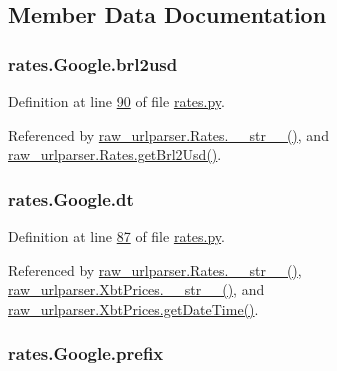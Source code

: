 \subsection{Member Data Documentation}
\subsubsection[{\texorpdfstring{brl2usd}{brl2usd}}]{\setlength{\rightskip}{0pt plus 5cm}rates.\+Google.\+brl2usd}\hypertarget{classrates_1_1_google_a0979ffcb18b8bf3156cc5735c67ca6df}{}\label{classrates_1_1_google_a0979ffcb18b8bf3156cc5735c67ca6df}


Definition at line \hyperlink{rates_8py_source_l00090}{90} of file \hyperlink{rates_8py_source}{rates.\+py}.



Referenced by \hyperlink{raw__urlparser_8py_source_l00038}{raw\+\_\+urlparser.\+Rates.\+\_\+\+\_\+str\+\_\+\+\_\+()}, and \hyperlink{raw__urlparser_8py_source_l00029}{raw\+\_\+urlparser.\+Rates.\+get\+Brl2\+Usd()}.

\subsubsection[{\texorpdfstring{dt}{dt}}]{\setlength{\rightskip}{0pt plus 5cm}rates.\+Google.\+dt}\hypertarget{classrates_1_1_google_a76574be36237f78780f76bed53e69ab2}{}\label{classrates_1_1_google_a76574be36237f78780f76bed53e69ab2}


Definition at line \hyperlink{rates_8py_source_l00087}{87} of file \hyperlink{rates_8py_source}{rates.\+py}.



Referenced by \hyperlink{raw__urlparser_8py_source_l00038}{raw\+\_\+urlparser.\+Rates.\+\_\+\+\_\+str\+\_\+\+\_\+()}, \hyperlink{raw__urlparser_8py_source_l00074}{raw\+\_\+urlparser.\+Xbt\+Prices.\+\_\+\+\_\+str\+\_\+\+\_\+()}, and \hyperlink{raw__urlparser_8py_source_l00059}{raw\+\_\+urlparser.\+Xbt\+Prices.\+get\+Date\+Time()}.

\subsubsection[{\texorpdfstring{prefix}{prefix}}]{\setlength{\rightskip}{0pt plus 5cm}rates.\+Google.\+prefix}\hypertarget{classrates_1_1_google_ada5de8700ad571d0ab819fa0163d6bbe}{}\label{classrates_1_1_google_ada5de8700ad571d0ab819fa0163d6bbe}


